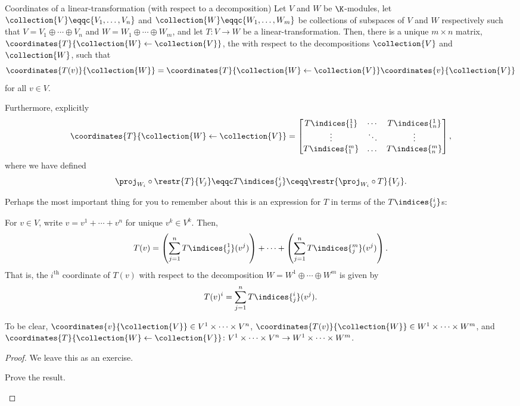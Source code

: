 \begin{thm}{Coordinates of a linear-transform\-ation (with respect to a decomposition)}{}
	Let $V$ and $W$ be $\K$-modules, let $\collection{V}\eqqc \{V_1,\ldots ,V_n\}$ and $\collection{W}\eqqc \{ W_1,\ldots ,W_m\}$ be collections of subspaces of $V$ and $W$ respectively such that $V=V_1\oplus \cdots \oplus V_n$ and $W=W_1\oplus \cdots \oplus W_m$, and let $T\colon V\rightarrow W$ be a linear-transformation.  Then, there is a unique $m\times n$ matrix, $\coordinates{T}{\collection{W}\leftarrow \collection{V}}$, the  with respect to the decompositions $\collection{V}$ and $\collection{W}$, such that
	\begin{equation}
		\coordinates{T(v)}{\collection{W}}=\coordinates{T}{\collection{W}\leftarrow \collection{V}}\coordinates{v}{\collection{V}}
	\end{equation}
	for all $v\in V$.
	
	Furthermore, explicitly
	\begin{equation}
		\coordinates{T}{\collection{W}\leftarrow \collection{V}}=\begin{bmatrix}T\indices{^1_1} & \cdots & T\indices{^1_n} \\ \vdots & \ddots & \vdots \\ T\indices{^m_1} & \dots & T\indices{^m_n}\end{bmatrix},
	\end{equation}
	where we have defined
	\begin{equation}
		\proj _{W_i}\circ \restr{T}{V_j}\eqqc T\indices{^i_j}\ceqq \restr{\proj _{W_i}\circ T}{V_j}.
	\end{equation}
	\begin{rmk}
		Perhaps the most important thing for you to remember about this is an expression for $T$ in terms of the $T\indices{^i_j}$s:
		
		For $v\in V$, write $v=v^1+\cdots +v^n$ for unique $v^k\in V^k$.  Then,
		\begin{equation}
			T(v)=\left( \sum _{j=1}^nT\indices{^1_j}(v^j)\right) +\cdots +\left( \sum _{j=1}^nT\indices{^m_j}(v^j)\right) .
		\end{equation}
		That is, the $i^{\text{th}}$ coordinate of $T(v)$ with respect to the decomposition $W=W^1\oplus \cdots \oplus W^m$ is given by
		\begin{equation}
			T(v)^i=\sum _{j=1}^nT\indices{^i_j}(v^j).
		\end{equation}
	\end{rmk}
	\begin{rmk}
		To be clear, $\coordinates{v}{\collection{V}}\in V^1\times \cdots \times V^n$, $\coordinates{T(v)}{\collection{W}}\in W^1\times \cdots \times W^m$, and $\coordinates{T}{\collection{W}\leftarrow \collection{V}}\colon V^1\times \cdots \times V^n\rightarrow W^1\times \cdots \times W^m$.
	\end{rmk}
	\begin{proof}
		We leave this as an exercise.
		\begin{exr}[breakable=false]{}{}
			Prove the result.
		\end{exr}
	\end{proof}
\end{thm}
